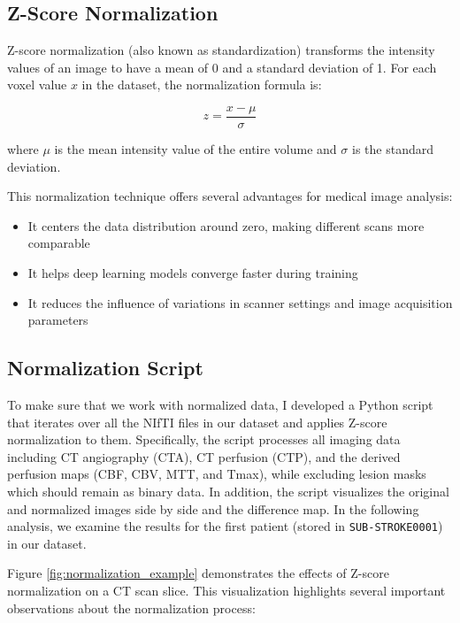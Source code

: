 \subsection{Z-Score Normalization}
\label{subsec:z_score_normalization}

Z-score normalization (also known as standardization) transforms the intensity values of an image to have a mean of 0 and a standard deviation of 1. For each voxel value $x$ in the dataset, the normalization formula is:

\begin{equation}
z = \frac{x - \mu}{\sigma}
\end{equation}

where $\mu$ is the mean intensity value of the entire volume and $\sigma$ is the standard deviation.

This normalization technique offers several advantages for medical image analysis:
\begin{itemize}
    \item It centers the data distribution around zero, making different scans more comparable
    \item It helps deep learning models converge faster during training
    \item It reduces the influence of variations in scanner settings and image acquisition parameters
\end{itemize}

\subsection{Normalization Script}
\label{subsec:normalization_implementation}

To make sure that we work with normalized data, I developed a Python script that iterates over all the NIfTI files in our dataset and applies Z-score normalization to them. Specifically, the script processes all imaging data including CT angiography (CTA), CT perfusion (CTP), and the derived perfusion maps (CBF, CBV, MTT, and Tmax), while excluding lesion masks which should remain as binary data. In addition, the script visualizes the original and normalized images side by side and the difference map.  In the following analysis, we examine the results for the first patient (stored in \texttt{SUB-STROKE0001}) in our dataset.


Figure \ref{fig:normalization_example} demonstrates the effects of Z-score normalization on a CT scan slice. This visualization highlights several important observations about the normalization process:

